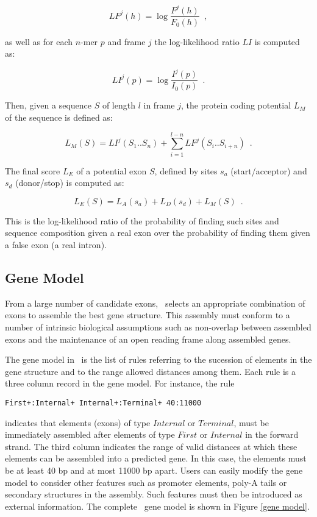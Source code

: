 \begin{equation}
LF^j(h) = \log{\frac{F^j(h)}{F_0(h)}}\,\,\,,
\end{equation}

\noindent as well as for each $n$-mer $p$ and frame $j$ the log-likelihood 
ratio $LI$ is computed as:

\begin{equation}
LI^j(p) = \log{\frac{I^j(p)}{I_0(p)}}\,\,\,.
\end{equation}

Then, given a sequence $S$ of length $l$ in frame $j$, the protein coding
potential $L_M$ of the sequence is defined as:

\begin{equation}
L_M(S) = LI^j(S_1..S_n) + \sum_{i=1}^{l-n}{LF^j(S_i..S_{i+n})}\,\,\,.
\end{equation}


The final score $L_E$ of a potential exon $S$, defined by sites $s_a$
(start/acceptor) and $s_d$ (donor/stop) is computed as:

\begin{equation}
L_E(S) = L_A(s_a) + L_D(s_d) + L_M(S)\,\,\,.
\end{equation}

This is the log-likelihood ratio of the probability of finding such sites 
and sequence composition given a real exon over the probability of finding 
them given a false exon (a real intron).


\subsection{Gene Model}

From a large number of candidate exons, \geneid\ selects an appropriate
combination of exons to assemble the best gene structure. This
assembly must conform to a number of intrinsic biological assumptions
such as non-overlap between assembled exons and the maintenance of an
open reading frame along assembled genes.

The gene model in \geneid\ is the list of rules referring to the
sucession of elements in the gene structure and to the range allowed
distances among them. Each rule is a three column record in the gene
model. For instance, the rule

\begin{center}
\texttt{First+:Internal+  Internal+:Terminal+  40:11000}
\end{center}

\noindent indicates that elements (exons) of type $Internal$ or $Terminal$,
must be immediately assembled after elements of type $First$ or
$Internal$ in the forward strand. The third column indicates the range
of valid distances at which these elements can be assembled into a
predicted gene. In this case, the elements must be at least 40 bp and
at most 11000 bp apart. Users can easily modify the gene model to
consider other features such as promoter elements, poly-A tails or
secondary structures in the assembly. Such features must then be
introduced as external information. The complete \geneid\ gene model
is shown in Figure \ref{gene model}.


